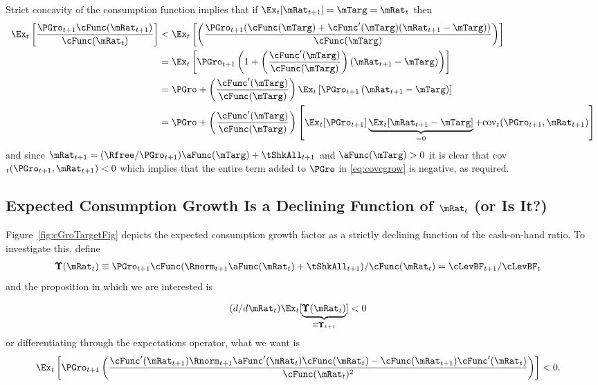 \documentclass[BufferStockTheory]{subfiles}
\begin{document}
Strict concavity of the consumption function implies that if $\Ex_{t}[{\mRat}_{t+1}] = \mTarg = \mRat_{t}$ then
\begin{align}
  \Ex_{t}\left[\frac{{\PGro}_{t+1} \cFunc({\mRat}_{t+1})}{\cFunc(\mRat_{t})}
  \right]  & < \Ex_{t}\left[\left(\frac{{\PGro}_{t+1}
             (\cFunc(\mTarg)+\cFunc^{\prime}(\mTarg)({\mRat}_{t+1}-\mTarg))}{\cFunc(\mTarg)}\right)\right]  \nonumber \\
           & = \Ex_{t}\left[{\PGro}_{t+1} \left(1+\left(\frac{\cFunc^{\prime}(\mTarg)}{%
             \cFunc(\mTarg)}\right)({\mRat}_{t+1}-\mTarg)\right)\right]  \nonumber  \\
           & = \PGro + \left(\frac{\cFunc^{\prime}(\mTarg)}{\cFunc(\mTarg)}\right)\Ex_{t}\left[ {\PGro}_{t+1}\left({\mRat}_{t+1}-\mTarg\right)\right]  \nonumber \\
           & = \PGro + \left(\frac{\cFunc^{\prime}(\mTarg)}{\cFunc(\mTarg)}\right)\left[
             \Ex_{t}[ \PGro_{t+1}]\underbrace{\Ex_{t}[
             {\mRat}_{t+1}-\mTarg]}_{=0}+\mbox{cov}_{t}( {\PGro}_{t+1},{\mRat}_{t+1})\right]
             \label{eq:covcgrow}
\end{align}
and since $\mRat_{t+1} = (\Rfree/\PGro_{t+1}) \aFunc(\mTarg)+\tShkAll_{t+1}$ and
$\aFunc(\mTarg)>0$ it is clear that
cov$_{t}({\PGro}_{t+1},{\mRat}_{t+1})<0$ which implies that
the entire term added to $\PGro$ in \eqref{eq:covcgrow} is negative, as
required.

\hypertarget{dcgdxneg}{}
\subsection{Expected Consumption Growth Is a Declining Function of $\mRat_{t}$ (or Is It?)}
\label{subsec:dcgdxneg}

Figure~\ref{fig:cGroTargetFig} depicts the expected consumption growth factor as a strictly
declining function of the cash-on-hand ratio. To investigate this,
define
\begin{align*}
  \pmb{\Upsilon}(\mRat_{t})  & \equiv  \PGro_{t+1} \cFunc(\Rnorm_{t+1}\aFunc(\mRat_{t})+\tShkAll_{t+1})/\cFunc(\mRat_{t})  = \cLevBF_{t+1}/\cLevBF_{t}
\end{align*}
and the proposition in which we are interested is

\begin{align}
  (d/d\mRat_{t})\Ex_{t}[\underbrace{\pmb{\Upsilon}(\mRat_{t})}_{\equiv \pmb{\Upsilon}_{t+1}}]  & < 0  \nonumber
\end{align}
or differentiating through the expectations operator, what we want is
\begin{align}
  \Ex_{t}\left[\PGro_{t+1} \left(\frac{\cFunc^{\prime}(\mRat_{t+1})\Rnorm_{t+1}\aFunc^{\prime}(\mRat_{t})\cFunc(\mRat_{t})-\cFunc(\mRat_{t+1})\cFunc^{\prime}(\mRat_{t})}{\cFunc(\mRat_{t})^{2}}\right)\right]  & < 0 \label{eq:kappaPrimeLT0}.
\end{align}
\end{document}
